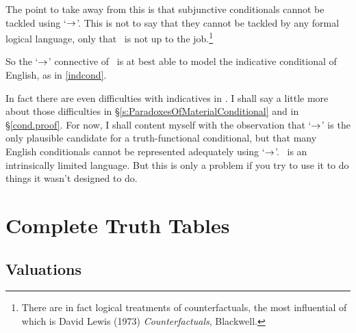 The point to take away from this is that subjunctive conditionals cannot be tackled using `$\rightarrow$'. This is not to say that they cannot be tackled by any formal logical language, only that \TFL\ is not up to the job.\footnote{There are in fact logical treatments of counterfactuals, the most influential of which is David Lewis (1973) \emph{Counterfactuals}, Blackwell.}

So the `$\rightarrow$' connective of \TFL\ is at best able to model the indicative conditional of English, as in \ref{indcond}.

In fact there are even difficulties with indicatives in \TFL. I shall say a little more about those difficulties in §\ref{s:ParadoxesOfMaterialConditional} and in §\ref{cond.proof}. For now, I shall content myself with the observation that `$\rightarrow$' is the only plausible candidate for a truth-functional conditional, but that many English conditionals cannot be represented adequately using `$\rightarrow$'. \TFL\ is an intrinsically limited language. But this is only a problem if you try to use it to do things it wasn't designed to do.




\chapter{Complete Truth Tables}\label{s:CompleteTruthTables}

\section{Valuations}\label{s:valuations}

